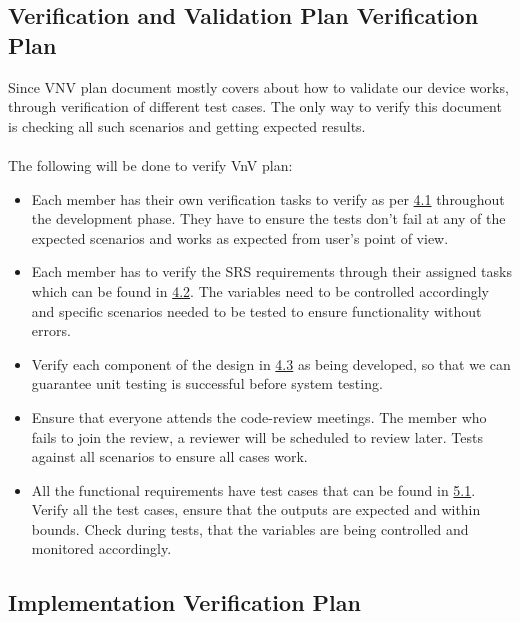 \documentclass[12pt, titlepage]{article}
\begin{document}
\subsection{Verification and Validation Plan Verification Plan}

Since VNV plan document mostly covers about how to validate our device works, through verification of different test cases. The only way to verify this document is checking all such scenarios and getting expected results.\\
\\The following will be done to verify VnV plan:\\
\begin{itemize}
  \item[\ding{111}] Each member has their own verification tasks to verify as per \hyperref[4_1]{4.1} throughout the development phase. They have to ensure the tests don't fail at any of the expected scenarios and works as expected from user's point of view.
  \item[\ding{111}] Each member has to verify the SRS requirements through their assigned tasks which can be found in \hyperref[SRS_verification]{4.2}. The variables need to be controlled accordingly and specific scenarios needed to be tested to ensure functionality without errors.
  \item[\ding{111}] Verify each component of the design in \hyperref[sec_4_3]{4.3} as being developed, so that we can guarantee unit testing is successful before system testing.
  \item[\ding{111}] Ensure that everyone attends the code-review meetings. The member who fails to join the review, a reviewer will be scheduled to review later. Tests against all scenarios to ensure all cases work.
  \item[\ding{111}] All the functional requirements have test cases that can be found in \hyperref[sec_5_1]{5.1}. Verify all the test cases, ensure that the outputs are expected and within bounds. Check during tests, that the variables are being controlled and monitored accordingly.
\end{itemize}
\subsection{Implementation Verification Plan}
\end{document}
